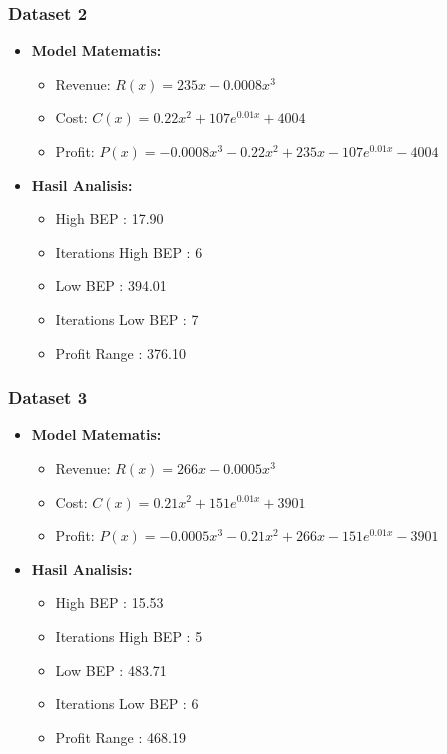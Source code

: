 \documentclass[conference]{IEEEtran}
\begin{document}
\subsubsection{Dataset 2}
\begin{itemize}
\item \textbf{Model Matematis:}
\begin{itemize}
\item Revenue: \( R(x) = 235x - 0.0008x^3 \)
\item Cost: \( C(x) = 0.22x^2 + 107e^{0.01x} + 4004 \)
\item Profit: \( P(x) = -0.0008x^3 - 0.22x^2 + 235x - 107e^{0.01x} - 4004 \)
\end{itemize}
\item \textbf{Hasil Analisis:}
\begin{itemize}
\item High BEP : 17.90
\item Iterations High BEP : 6
\item Low BEP : 394.01
\item Iterations Low BEP : 7
\item Profit Range : 376.10
\end{itemize}
\end{itemize}

\subsubsection{Dataset 3}
\begin{itemize}
\item \textbf{Model Matematis:}
\begin{itemize}
\item Revenue: \( R(x) = 266x - 0.0005x^3 \)
\item Cost: \( C(x) = 0.21x^2 + 151e^{0.01x} + 3901 \)
\item Profit: \( P(x) = -0.0005x^3 - 0.21x^2 + 266x - 151e^{0.01x} - 3901 \)
\end{itemize}
\item \textbf{Hasil Analisis:}
\begin{itemize}
\item High BEP : 15.53
\item Iterations High BEP : 5
\item Low BEP : 483.71
\item Iterations Low BEP : 6
\item Profit Range : 468.19
\end{itemize}
\end{itemize}
\end{document}
